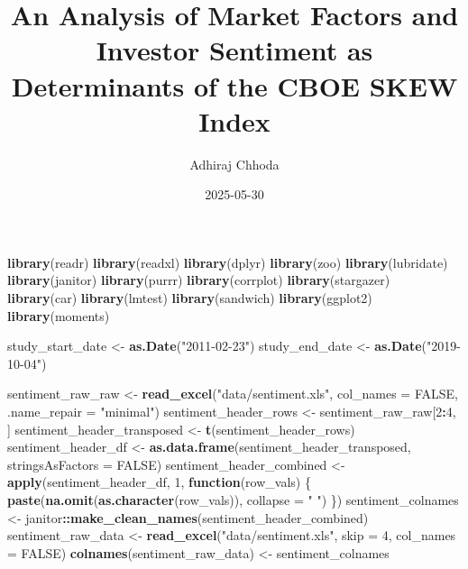 \documentclass[
]{article}
\title{An Analysis of Market Factors and Investor Sentiment as
Determinants of the CBOE SKEW Index}
\author{Adhiraj Chhoda}
\date{2025-05-30}
\newenvironment{Shaded}{\begin{snugshade}}{\end{snugshade}}
\newcommand{\AttributeTok}[1]{\textcolor[rgb]{0.13,0.29,0.53}{#1}}
\newcommand{\ConstantTok}[1]{\textcolor[rgb]{0.56,0.35,0.01}{#1}}
\newcommand{\ControlFlowTok}[1]{\textcolor[rgb]{0.13,0.29,0.53}{\textbf{#1}}}
\newcommand{\DecValTok}[1]{\textcolor[rgb]{0.00,0.00,0.81}{#1}}
\newcommand{\FunctionTok}[1]{\textcolor[rgb]{0.13,0.29,0.53}{\textbf{#1}}}
\newcommand{\NormalTok}[1]{#1}
\newcommand{\OtherTok}[1]{\textcolor[rgb]{0.56,0.35,0.01}{#1}}
\newcommand{\SpecialCharTok}[1]{\textcolor[rgb]{0.81,0.36,0.00}{\textbf{#1}}}
\newcommand{\StringTok}[1]{\textcolor[rgb]{0.31,0.60,0.02}{#1}}
\begin{document}
\maketitle

{
\setcounter{tocdepth}{2}
\tableofcontents
}
\begin{Shaded}
\begin{Highlighting}[]
  \FunctionTok{library}\NormalTok{(readr)}
  \FunctionTok{library}\NormalTok{(readxl)}
  \FunctionTok{library}\NormalTok{(dplyr)}
  \FunctionTok{library}\NormalTok{(zoo)}
  \FunctionTok{library}\NormalTok{(lubridate)}
  \FunctionTok{library}\NormalTok{(janitor)}
  \FunctionTok{library}\NormalTok{(purrr)}
  \FunctionTok{library}\NormalTok{(corrplot)}
  \FunctionTok{library}\NormalTok{(stargazer)}
  \FunctionTok{library}\NormalTok{(car)}
  \FunctionTok{library}\NormalTok{(lmtest) }
  \FunctionTok{library}\NormalTok{(sandwich)}
  \FunctionTok{library}\NormalTok{(ggplot2)}
  \FunctionTok{library}\NormalTok{(moments)}
  
\NormalTok{  study\_start\_date }\OtherTok{\textless{}{-}} \FunctionTok{as.Date}\NormalTok{(}\StringTok{"2011{-}02{-}23"}\NormalTok{)}
\NormalTok{  study\_end\_date }\OtherTok{\textless{}{-}} \FunctionTok{as.Date}\NormalTok{(}\StringTok{"2019{-}10{-}04"}\NormalTok{)}
  
\NormalTok{  sentiment\_raw\_raw }\OtherTok{\textless{}{-}} \FunctionTok{read\_excel}\NormalTok{(}\StringTok{"data/sentiment.xls"}\NormalTok{, }\AttributeTok{col\_names =} \ConstantTok{FALSE}\NormalTok{, }\AttributeTok{.name\_repair =} \StringTok{"minimal"}\NormalTok{)}
\NormalTok{  sentiment\_header\_rows }\OtherTok{\textless{}{-}}\NormalTok{ sentiment\_raw\_raw[}\DecValTok{2}\SpecialCharTok{:}\DecValTok{4}\NormalTok{, ]}
\NormalTok{  sentiment\_header\_transposed }\OtherTok{\textless{}{-}} \FunctionTok{t}\NormalTok{(sentiment\_header\_rows)}
\NormalTok{  sentiment\_header\_df }\OtherTok{\textless{}{-}} \FunctionTok{as.data.frame}\NormalTok{(sentiment\_header\_transposed, }\AttributeTok{stringsAsFactors =} \ConstantTok{FALSE}\NormalTok{)}
\NormalTok{  sentiment\_header\_combined }\OtherTok{\textless{}{-}} \FunctionTok{apply}\NormalTok{(sentiment\_header\_df, }\DecValTok{1}\NormalTok{, }\ControlFlowTok{function}\NormalTok{(row\_vals) \{}
    \FunctionTok{paste}\NormalTok{(}\FunctionTok{na.omit}\NormalTok{(}\FunctionTok{as.character}\NormalTok{(row\_vals)), }\AttributeTok{collapse =} \StringTok{" "}\NormalTok{)}
\NormalTok{  \})}
\NormalTok{  sentiment\_colnames }\OtherTok{\textless{}{-}}\NormalTok{ janitor}\SpecialCharTok{::}\FunctionTok{make\_clean\_names}\NormalTok{(sentiment\_header\_combined)}
\NormalTok{  sentiment\_raw\_data }\OtherTok{\textless{}{-}} \FunctionTok{read\_excel}\NormalTok{(}\StringTok{"data/sentiment.xls"}\NormalTok{, }\AttributeTok{skip =} \DecValTok{4}\NormalTok{, }\AttributeTok{col\_names =} \ConstantTok{FALSE}\NormalTok{)}
  \FunctionTok{colnames}\NormalTok{(sentiment\_raw\_data) }\OtherTok{\textless{}{-}}\NormalTok{ sentiment\_colnames}
  

\end{Highlighting}
\end{Shaded}
\end{document}
